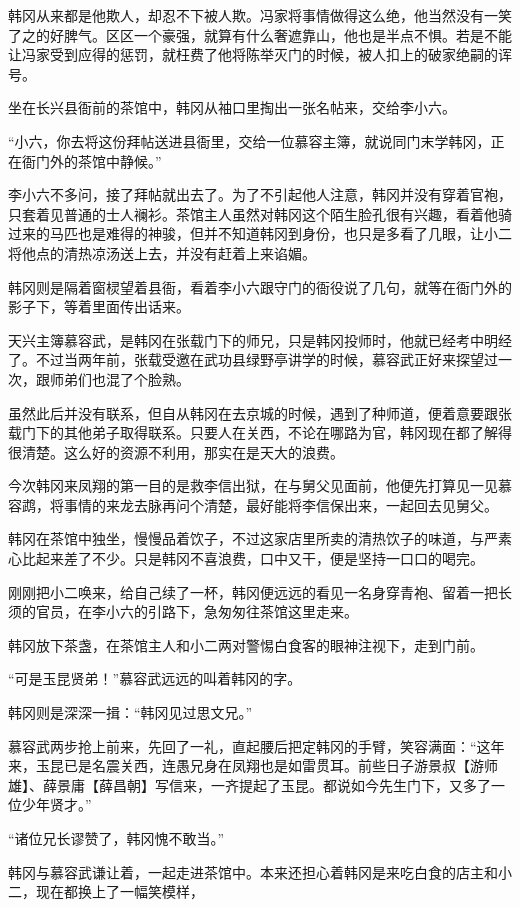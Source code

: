 韩冈从来都是他欺人，却忍不下被人欺。冯家将事情做得这么绝，他当然没有一笑了之的好脾气。区区一个豪强，就算有什么奢遮靠山，他也是半点不惧。若是不能让冯家受到应得的惩罚，就枉费了他将陈举灭门的时候，被人扣上的破家绝嗣的诨号。

坐在长兴县衙前的茶馆中，韩冈从袖口里掏出一张名帖来，交给李小六。

“小六，你去将这份拜帖送进县衙里，交给一位慕容主簿，就说同门末学韩冈，正在衙门外的茶馆中静候。”

李小六不多问，接了拜帖就出去了。为了不引起他人注意，韩冈并没有穿着官袍，只套着见普通的士人襕衫。茶馆主人虽然对韩冈这个陌生脸孔很有兴趣，看着他骑过来的马匹也是难得的神骏，但并不知道韩冈到身份，也只是多看了几眼，让小二将他点的清热凉汤送上去，并没有赶着上来谄媚。

韩冈则是隔着窗棂望着县衙，看着李小六跟守门的衙役说了几句，就等在衙门外的影子下，等着里面传出话来。

天兴主簿慕容武，是韩冈在张载门下的师兄，只是韩冈投师时，他就已经考中明经了。不过当两年前，张载受邀在武功县绿野亭讲学的时候，慕容武正好来探望过一次，跟师弟们也混了个脸熟。

虽然此后并没有联系，但自从韩冈在去京城的时候，遇到了种师道，便着意要跟张载门下的其他弟子取得联系。只要人在关西，不论在哪路为官，韩冈现在都了解得很清楚。这么好的资源不利用，那实在是天大的浪费。

今次韩冈来凤翔的第一目的是救李信出狱，在与舅父见面前，他便先打算见一见慕容鹉，将事情的来龙去脉再问个清楚，最好能将李信保出来，一起回去见舅父。

韩冈在茶馆中独坐，慢慢品着饮子，不过这家店里所卖的清热饮子的味道，与严素心比起来差了不少。只是韩冈不喜浪费，口中又干，便是坚持一口口的喝完。

刚刚把小二唤来，给自己续了一杯，韩冈便远远的看见一名身穿青袍、留着一把长须的官员，在李小六的引路下，急匆匆往茶馆这里走来。

韩冈放下茶盏，在茶馆主人和小二两对警惕白食客的眼神注视下，走到门前。

“可是玉昆贤弟！”慕容武远远的叫着韩冈的字。

韩冈则是深深一揖：“韩冈见过思文兄。”

慕容武两步抢上前来，先回了一礼，直起腰后把定韩冈的手臂，笑容满面：“这年来，玉昆已是名震关西，连愚兄身在凤翔也是如雷贯耳。前些日子游景叔【游师雄】、薛景庸【薛昌朝】写信来，一齐提起了玉昆。都说如今先生门下，又多了一位少年贤才。”

“诸位兄长谬赞了，韩冈愧不敢当。”

韩冈与慕容武谦让着，一起走进茶馆中。本来还担心着韩冈是来吃白食的店主和小二，现在都换上了一幅笑模样，

